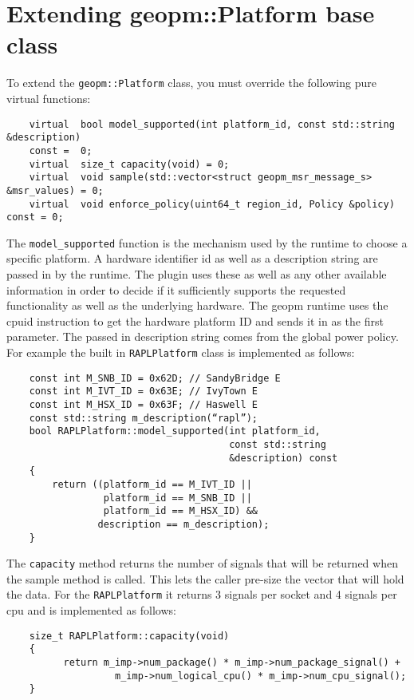 \documentclass[11pt]{article}
\begin{document}
\section{Extending geopm::Platform base class}
To extend the \verb#geopm::Platform# class, you must override the
following pure virtual functions:
\begin{verbatim}
    virtual  bool model_supported(int platform_id, const std::string &description)
    const =  0;
    virtual  size_t capacity(void) = 0;
    virtual  void sample(std::vector<struct geopm_msr_message_s> &msr_values) = 0;
    virtual  void enforce_policy(uint64_t region_id, Policy &policy) const = 0;
\end{verbatim}
The \verb#model_supported# function is the mechanism used by the
runtime to choose a specific platform. A hardware identifier id as
well as a description string are passed in by the runtime.  The plugin
uses these as well as any other available information in order to
decide if it sufficiently supports the requested functionality as well
as the underlying hardware. The geopm runtime uses the cpuid
instruction to get the hardware platform ID and sends it in as the
first parameter. The passed in description string comes from the
global power policy. For example the built in \verb#RAPLPlatform#
class is implemented as follows:
\begin{verbatim}
    const int M_SNB_ID = 0x62D; // SandyBridge E
    const int M_IVT_ID = 0x63E; // IvyTown E
    const int M_HSX_ID = 0x63F; // Haswell E
    const std::string m_description(“rapl”);
    bool RAPLPlatform::model_supported(int platform_id,
                                       const std::string
                                       &description) const
    {
        return ((platform_id == M_IVT_ID ||
                 platform_id == M_SNB_ID ||
                 platform_id == M_HSX_ID) &&
                description == m_description);
    }
\end{verbatim}
The \verb#capacity# method returns the number of signals that will be
returned when the sample method is called. This lets the caller
pre-size the vector that will hold the data. For the
\verb#RAPLPlatform# it returns 3 signals per socket and 4 signals per
cpu and is implemented as follows:
\begin{verbatim}
    size_t RAPLPlatform::capacity(void)
    {
          return m_imp->num_package() * m_imp->num_package_signal() +
                   m_imp->num_logical_cpu() * m_imp->num_cpu_signal();
    }
\end{verbatim}
\end{document}
